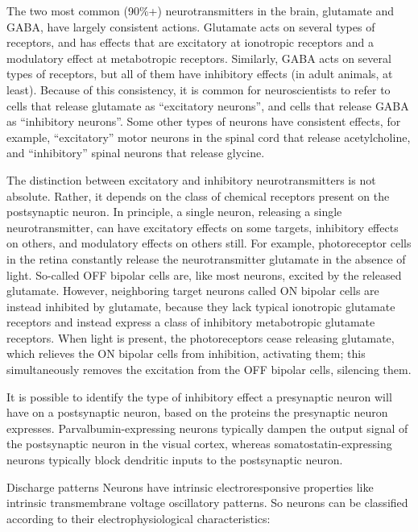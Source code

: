 The two most common (90\%+) neurotransmitters in the brain, glutamate and GABA, have largely consistent actions. Glutamate acts on several types of receptors, and has effects that are excitatory at ionotropic receptors and a modulatory effect at metabotropic receptors. Similarly, GABA acts on several types of receptors, but all of them have inhibitory effects (in adult animals, at least). Because of this consistency, it is common for neuroscientists to refer to cells that release glutamate as ``excitatory neurons'', and cells that release GABA as ``inhibitory neurons''. Some other types of neurons have consistent effects, for example, ``excitatory'' motor neurons in the spinal cord that release acetylcholine, and ``inhibitory'' spinal neurons that release glycine.

The distinction between excitatory and inhibitory neurotransmitters is not absolute. Rather, it depends on the class of chemical receptors present on the postsynaptic neuron. In principle, a single neuron, releasing a single neurotransmitter, can have excitatory effects on some targets, inhibitory effects on others, and modulatory effects on others still. For example, photoreceptor cells in the retina constantly release the neurotransmitter glutamate in the absence of light. So-called OFF bipolar cells are, like most neurons, excited by the released glutamate. However, neighboring target neurons called ON bipolar cells are instead inhibited by glutamate, because they lack typical ionotropic glutamate receptors and instead express a class of inhibitory metabotropic glutamate receptors. When light is present, the photoreceptors cease releasing glutamate, which relieves the ON bipolar cells from inhibition, activating them; this simultaneously removes the excitation from the OFF bipolar cells, silencing them.

It is possible to identify the type of inhibitory effect a presynaptic neuron will have on a postsynaptic neuron, based on the proteins the presynaptic neuron expresses. Parvalbumin-expressing neurons typically dampen the output signal of the postsynaptic neuron in the visual cortex, whereas somatostatin-expressing neurons typically block dendritic inputs to the postsynaptic neuron.

Discharge patterns
Neurons have intrinsic electroresponsive properties like intrinsic transmembrane voltage oscillatory patterns. So neurons can be classified according to their electrophysiological characteristics:

